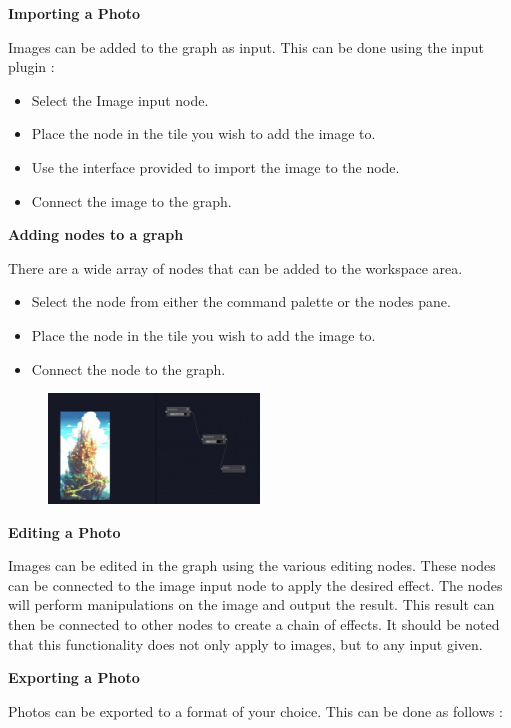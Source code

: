 \documentclass[11pt,a4paper]{article}
\begin{document}
\textbf{Importing a Photo}

Images can be added to the graph as input. This can be done using the input plugin : 
\begin{itemize}
  \item[\textbullet] Select the Image input node.
  \item[\textbullet] Place the node in the tile you wish to add the image to.
  \item[\textbullet] Use the interface provided to import the image to the node.
  \item[\textbullet] Connect the image to the graph.
\end{itemize}

\textbf{Adding nodes to a graph}

There are a wide array of nodes that can be added to the workspace area.
\begin{itemize}
  \item[\textbullet] Select the node from either the command palette or the nodes pane.
  \item[\textbullet] Place the node in the tile you wish to add the image to.
  \item[\textbullet] Connect the node to the graph.
\end{itemize}

\begin{figure}[H]
  \centering
  \href{https://www.youtube.com/watch?v=ak3Bto3phqk}
  {\includegraphics[width=0.5\textwidth]{../pics/nodes.png}}
\end{figure}


\textbf{Editing a Photo}

Images can be edited in the graph using the various editing nodes. These nodes can be connected to the image input node to apply the desired effect.
The nodes will perform manipulations on the image and output the result. This result can then be connected to other nodes to create a chain of effects.
It should be noted that this functionality does not only apply to images, but to any input given.

\textbf{Exporting a Photo}

Photos can be exported to a format of your choice. This can be done as follows :
\end{document}
